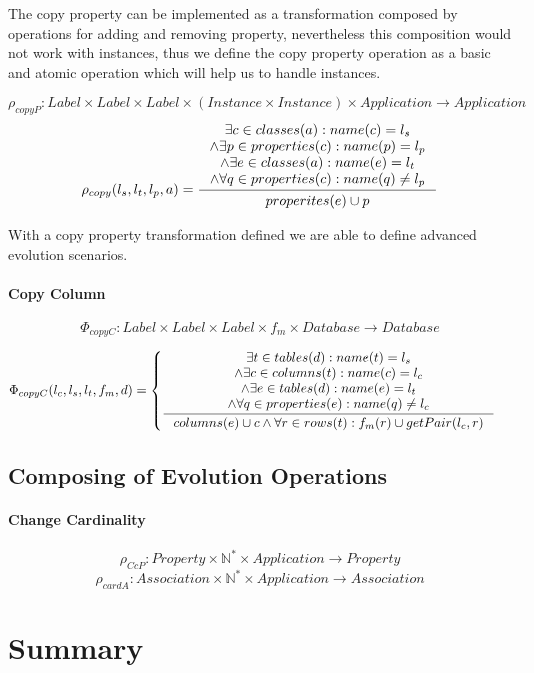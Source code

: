 \documentclass[11pt]{article}
\begin{document}
The copy property can be implemented as a transformation composed by operations for adding and removing property, nevertheless this composition would not work with instances, thus we define the copy property operation as a basic and atomic operation which will help us to handle instances.

$$\rho_{copyP} : Label \times Label \times Label \times (Instance \times Instance) \times Application \rightarrow Application $$
\begin{equation*}
	\rho_{copy}(l_s, l_t, l_p, a) = \inference{\exists c \in classes(a) : name(c) = l_s \\ \wedge \exists p \in properties(c) : name(p) = l_p \\ \wedge \exists e \in classes(a) : name(e) = l_t  \\ \wedge \forall q \in properties(c) : name(q) \neq l_p}{\begin{gathered}
properites(e) \cup p 
\end{gathered}
}
\end{equation*}

With a copy property transformation defined we are able to define advanced evolution scenarios.

\paragraph{Copy Column}
$$\Phi_{copyC} : Label \times Label \times Label \times f_m \times Database \rightarrow Database $$

\begin{equation*}
	\begin{gathered}
		\Phi_{copyC}(l_c, l_s, l_t, f_m, d) = \begin{cases}
 		\inference{\exists t \in tables(d) : name(t) = l_s \\ \wedge \exists c \in columns(t) : name(c) = l_c \\ \wedge \exists e \in tables(d) : name(e) = l_t  \\ \wedge \forall q \in properties(e) : name(q) \neq l_c}{columns(e) \cup c \wedge \forall r \in rows(t) : f_m(r) \cup getPair(l_c,r)}
	\end{cases}
	\end{gathered}
\end{equation*}

\subsection{Composing of Evolution Operations}

\paragraph{Change Cardinality}
$$\rho_{CcP} : Property \times \mathbb{N^{*}} \times Application \rightarrow Property $$
$$\rho_{cardA} : Association \times \mathbb{N^{*}} \times Application \rightarrow Association $$

\section{Summary}
\end{document}

